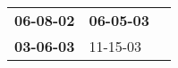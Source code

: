 \begin{supertabular}{p{0.33\columnwidth}p{0.33\columnwidth}p{0.33\columnwidth}}
 \textbf{06-08-02\textsuperscript{}} &  \textbf{06-05-03\textsuperscript{}} \\
 \textbf{03-06-03\textsuperscript{}} &           11-15-03\textsuperscript{} \\
\end{supertabular}
